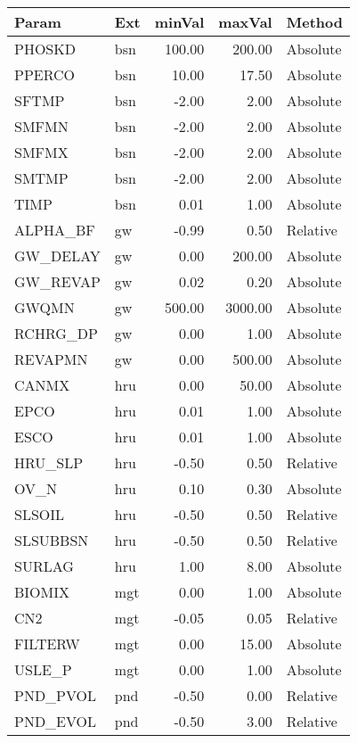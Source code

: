 \begin{table}[ht]
\centering
\begin{tabular}{llrrl}
  \hline
Param & Ext & minVal & maxVal & Method \\ 
  \hline
PHOSKD & bsn & 100.00 & 200.00 & Absolute \\ 
  PPERCO & bsn & 10.00 & 17.50 & Absolute \\ 
  SFTMP & bsn & -2.00 & 2.00 & Absolute \\ 
  SMFMN & bsn & -2.00 & 2.00 & Absolute \\ 
  SMFMX & bsn & -2.00 & 2.00 & Absolute \\ 
  SMTMP & bsn & -2.00 & 2.00 & Absolute \\ 
  TIMP & bsn & 0.01 & 1.00 & Absolute \\ 
  ALPHA\_BF & gw & -0.99 & 0.50 & Relative \\ 
  GW\_DELAY & gw & 0.00 & 200.00 & Absolute \\ 
  GW\_REVAP & gw & 0.02 & 0.20 & Absolute \\ 
  GWQMN & gw & 500.00 & 3000.00 & Absolute \\ 
  RCHRG\_DP & gw & 0.00 & 1.00 & Absolute \\ 
  REVAPMN & gw & 0.00 & 500.00 & Absolute \\ 
  CANMX & hru & 0.00 & 50.00 & Absolute \\ 
  EPCO & hru & 0.01 & 1.00 & Absolute \\ 
  ESCO & hru & 0.01 & 1.00 & Absolute \\ 
  HRU\_SLP & hru & -0.50 & 0.50 & Relative \\ 
  OV\_N & hru & 0.10 & 0.30 & Absolute \\ 
  SLSOIL & hru & -0.50 & 0.50 & Relative \\ 
  SLSUBBSN & hru & -0.50 & 0.50 & Relative \\ 
  SURLAG & hru & 1.00 & 8.00 & Absolute \\ 
  BIOMIX & mgt & 0.00 & 1.00 & Absolute \\ 
  CN2 & mgt & -0.05 & 0.05 & Relative \\ 
  FILTERW & mgt & 0.00 & 15.00 & Absolute \\ 
  USLE\_P & mgt & 0.00 & 1.00 & Absolute \\ 
  PND\_PVOL & pnd & -0.50 & 0.00 & Relative \\ 
  PND\_EVOL & pnd & -0.50 & 3.00 & Relative \\ 

\end{tabular}
\end{table}
